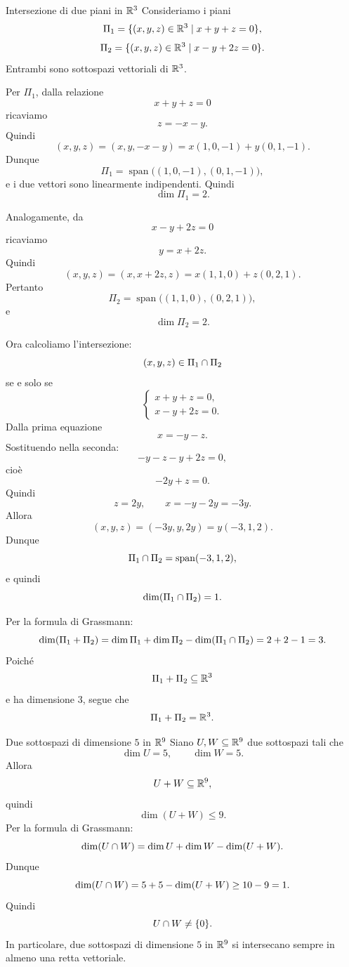 \documentclass[a4paper]{article}
\begin{document}
\begin{snippetexample}{Intersezione di due piani in \(\mathbb{R}^3\)}
    Consideriamo i piani
    \[
        \Pi_1=\{(x,y,z)\in\mathbb{R}^3\mid x+y+z=0\},
    \]
    \[
        \Pi_2=\{(x,y,z)\in\mathbb{R}^3\mid x-y+2z=0\}.
    \]
    Entrambi sono sottospazi vettoriali di \(\mathbb{R}^3\).

    Per \(\Pi_1\), dalla relazione
    \[
        x+y+z=0
    \]
    ricaviamo
    \[
        z=-x-y.
    \]
    Quindi
    \[
        (x,y,z)=(x,y,-x-y)
        =
        x(1,0,-1)+y(0,1,-1).
    \]
    Dunque
    \[
        \Pi_1=\operatorname{span}\bigl((1,0,-1),(0,1,-1)\bigr),
    \]
    e i due vettori sono linearmente indipendenti. Quindi
    \[
        \dim \Pi_1=2.
    \]

    Analogamente, da
    \[
        x-y+2z=0
    \]
    ricaviamo
    \[
        y=x+2z.
    \]
    Quindi
    \[
        (x,y,z)=(x,x+2z,z)
        =
        x(1,1,0)+z(0,2,1).
    \]
    Pertanto
    \[
        \Pi_2=\operatorname{span}\bigl((1,1,0),(0,2,1)\bigr),
    \]
    e
    \[
        \dim \Pi_2=2.
    \]

    Ora calcoliamo l'intersezione:
    \[
        (x,y,z)\in\Pi_1\cap\Pi_2
    \]
    se e solo se
    \[
        \begin{cases}
            x+y+z=0,\\
            x-y+2z=0.
        \end{cases}
    \]
    Dalla prima equazione
    \[
        x=-y-z.
    \]
    Sostituendo nella seconda:
    \[
        -y-z-y+2z=0,
    \]
    cioè
    \[
        -2y+z=0.
    \]
    Quindi
    \[
        z=2y,
        \qquad
        x=-y-2y=-3y.
    \]
    Allora
    \[
        (x,y,z)=(-3y,y,2y)=y(-3,1,2).
    \]
    Dunque
    \[
        \Pi_1\cap\Pi_2=\operatorname{span}(-3,1,2),
    \]
    e quindi
    \[
        \dim(\Pi_1\cap\Pi_2)=1.
    \]

    Per la formula di Grassmann:
    \[
        \dim(\Pi_1+\Pi_2)
        =
        \dim\Pi_1+\dim\Pi_2-\dim(\Pi_1\cap\Pi_2)
        =
        2+2-1=3.
    \]
    Poiché
    \[
        \Pi_1+\Pi_2\subseteq\mathbb{R}^3
    \]
    e ha dimensione \(3\), segue che
    \[
        \Pi_1+\Pi_2=\mathbb{R}^3.
    \]
\end{snippetexample}

\begin{snippetexample}{Due sottospazi di dimensione \(5\) in \(\mathbb{R}^9\)}
    Siano \(U,W\subseteq\mathbb{R}^9\) due sottospazi tali che
    \[
        \dim U=5,
        \qquad
        \dim W=5.
    \]
    Allora
    \[
        U+W\subseteq\mathbb{R}^9,
    \]
    quindi
    \[
        \dim(U+W)\leq 9.
    \]
    Per la formula di Grassmann:
    \[
        \dim(U\cap W)
        =
        \dim U+\dim W-\dim(U+W).
    \]
    Dunque
    \[
        \dim(U\cap W)
        =
        5+5-\dim(U+W)
        \geq
        10-9
        =
        1.
    \]
    Quindi
    \[
        U\cap W\neq\{0\}.
    \]
    In particolare, due sottospazi di dimensione \(5\) in \(\mathbb{R}^9\) si intersecano sempre in almeno una retta vettoriale.
\end{snippetexample}
\end{document}
